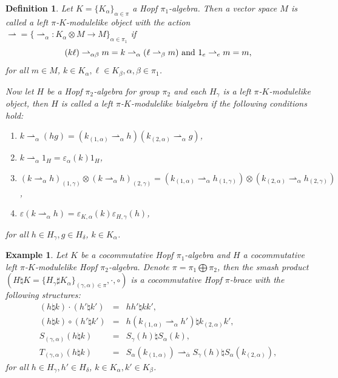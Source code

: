 \documentclass[11pt]{article}
\def\a{\alpha}
\def\b{\beta}
\def\d{\delta}
\def\g{\gamma}
\def\v{\varepsilon}
\newtheorem{definition}[theorem]{Definition}
\newtheorem{example}[theorem]{Example}
\begin{document}
\begin{definition}\cite{Wang}
Let $K=\{K_\a\}_{\a\in\pi}$ a Hopf $\pi_1$-algebra. Then a vector space $M$ is called a  left $\pi$-$K$-modulelike object with the action $\rightharpoonup=\{\rightharpoonup_\a: K_\a \otimes M \rightarrow M\}_{\a\in\pi_1}$ if 
$$(k\ell)\rightharpoonup_{\a\b} m = k\rightharpoonup_\a(\ell\rightharpoonup_\b m)\ \hbox{and}\ 1_e \rightharpoonup_e m =m,$$ 
for all $m\in M$, $k\in K_\a,\ell\in K_\b, \a,\b\in\pi_1$. 

Now let $H$ be a Hopf $\pi_2$-algebra for group $\pi_2$ and each $H_\g$ is a left $\pi$-$K$-modulelike object, then $H$ is called a  left $\pi$-$K$-modulelike bialgebra if the following conditions hold:
\begin{enumerate}[\quad\rm(1)]
  \item $k\rightharpoonup_{\a}(hg)=(k_{(1,\a)}\rightharpoonup_\a h)(k_{(2,\a)}\rightharpoonup_\a g)$,
  \item $k\rightharpoonup_{\a}1_H=\v_\a(k)1_H$,
  \item $(k\rightharpoonup_\a h)_{(1,\g)} \otimes (k\rightharpoonup_\a h)_{(2,\g)} = (k_{(1,\a)}\rightharpoonup_\a h_{(1,\g)})\otimes(k_{(2,\a)}\rightharpoonup_\a h_{(2,\g)})$,
  \item $\v(k\rightharpoonup_\a h)=\v_{K,\a}(k)\v_{H,\g}(h)$,
\end{enumerate}
for all $h\in H_\g,g\in H_\d$, $k\in K_\a$.
\end{definition}

\begin{example} \label{ex:modlike}
Let $K$ be a cocommutative Hopf $\pi_1$-algebra and $H$ a cocommutative left $\pi$-$K$-modulelike Hopf $\pi_2$-algebra. Denote $\pi=\pi_1\bigoplus\pi_2$, then the smash product $(H\natural K=\{H_\g\sharp K_\a\}_{(\g,\a)\in\pi},\cdot,\circ)$ is a cocommutative Hopf $\pi$-brace with the following structures:
\begin{eqnarray*}
  (h\natural k)\cdot(h'\natural k') &=& hh'\natural kk', \\
  (h\natural k)\circ(h'\natural k') &=& h(k_{(1,\a)}\rightharpoonup_{\a}h')\natural k_{(2,\a)}k', \\
  S_{(\g,\a)}(h\natural k) &=& S_\g(h)\natural S_\a(k), \\
  T_{(\g,\a)}(h\natural k) &=& S_\a(k_{(1,\a)})\rightharpoonup_{\bar{\a}}S_\g(h)\natural S_\a(k_{(2,\a)}), 
\end{eqnarray*}
for all $h\in H_\g,h'\in H_\d$, $k\in K_\a,k'\in K_\b$.
\end{example}
\end{document}
